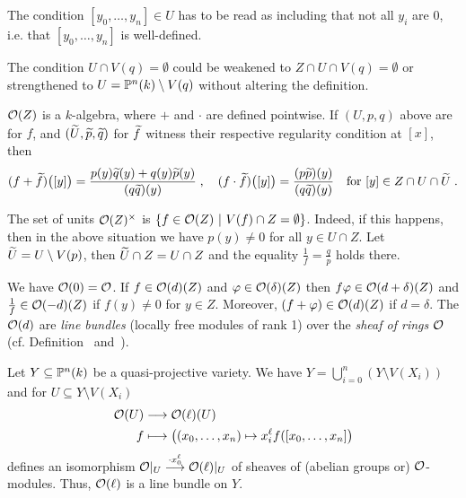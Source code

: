 \documentclass[a4paper,parskip=half,numbers=enddot, DIV=12]{scrreprt}
\begin{document}
\begin{rem*}
    \begin{alphanumerate}
        \item 
            The condition $[y_0,\ldots, y_n]\in U$ has to be read as including that not all $y_i$ are $0$, i.e. that $[y_0,\ldots, y_n]$ is well-defined.
        \item 
            The condition $U\cap V(q) = \emptyset$ could be weakened to $Z\cap U\cap V(q) = \emptyset$ or strengthened to $U=\mathbb{P}^n(k)\setminus V(q)$ without altering the definition.
        \item 
            $\mathcal{O}(Z)$ is a $k$-algebra, where $+$ and $\cdot$ are defined pointwise. If $(U,p,q)$ above are for $f$, and $(\snake U, \snake p, \snake q)$ for $\snake f$ witness their respective regularity condition at $[x]$, then
            \begin{align*}
                (f+\snake f)\big([y]\big) = \frac{p(y)\snake q(y) + q(y)\snake p(y)}{(q\snake q)(y)}\;,\quad
                (f\cdot\snake f)\big([y]\big) = \frac{(p\snake p)(y)}{(q\snake q)(y)}\quad\text{for }[y]\in Z\cap U\cap\snake U\;.
            \end{align*}
        \item 
            The set of units $\mathcal{O}(Z)^\times$ is $\left\{f\in \mathcal{O}(Z)\ \middle|\  V(f)\cap Z = \emptyset\right\}$. Indeed, if this happens, then in the above situation we have $p(y)\neq0$ for all $y\in U\cap Z$. Let $\snake U = U\setminus V(p)$, then $\snake U \cap Z = U\cap Z$ and the equality $\frac{1}{f} = \frac{q}{p}$ holds there.
        \item We have $\mathcal{O}(0)=\mathcal{O}$. If $f\in \mathcal{O}(d)(Z)$ and $\varphi\in\mathcal{O}(\delta)(Z)$ then $f\varphi \in \mathcal{O}(d+\delta)(Z)$ and $\frac{1}{f}\in \mathcal{O}(-d)(Z)$ if $f(y) \neq 0$ for $y\in Z$. Moreover, $(f+\varphi)\in \mathcal{O}(d)(Z)$ if $d=\delta$. The $\mathcal{O}(d)$ are \emph{line bundles} (locally free modules of rank 1) over the \emph{sheaf of rings} $\mathcal{O}$ (cf. Definition~ and~).
    \end{alphanumerate}
\end{rem*}
\begin{example}
    Let $Y\subseteq \mathbb{P}^n(k)$ be a quasi-projective variety. We have $Y = \bigcup_{i=0}^n (Y\setminus V(X_i))$ and for $U\subseteq Y\setminus V(X_i)$
    \begin{align*}
        \Oo(U) &\morphism \Oo(\ell)(U)\\
        f&\longmapsto \big((x_0,\ldots, x_n) \mapsto x_i^\ell f([x_0,\ldots, x_n]\big)
    \end{align*}
    defines an isomorphism $\Oo|_U \morphism[\cdot x_0^\ell] \Oo(\ell)|_U$ of sheaves of (abelian groups or) $\mathcal{O}$-modules. Thus, $\mathcal{O}(\ell)$ is a line bundle on $Y$. 
\end{example}
\end{document}
